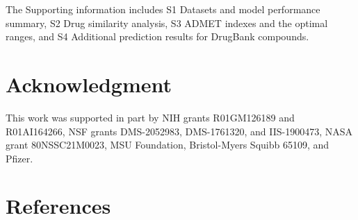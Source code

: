 \documentclass[10pt]{article}
\begin{document}
		The Supporting information includes
		 S1 Datasets and model performance summary, 
		 S2 Drug similarity analysis, S3 ADMET indexes and the optimal ranges, and S4 Additional prediction results for DrugBank compounds.

		\section*{Acknowledgment}	
	This work was supported in part by NIH grants R01GM126189 and R01AI164266, NSF grants
	DMS-2052983, DMS-1761320, and IIS-1900473, NASA grant 80NSSC21M0023, MSU Foundation, Bristol-Myers Squibb 65109, and Pfizer.

		
		
		\section*{References}
		
\end{document}
